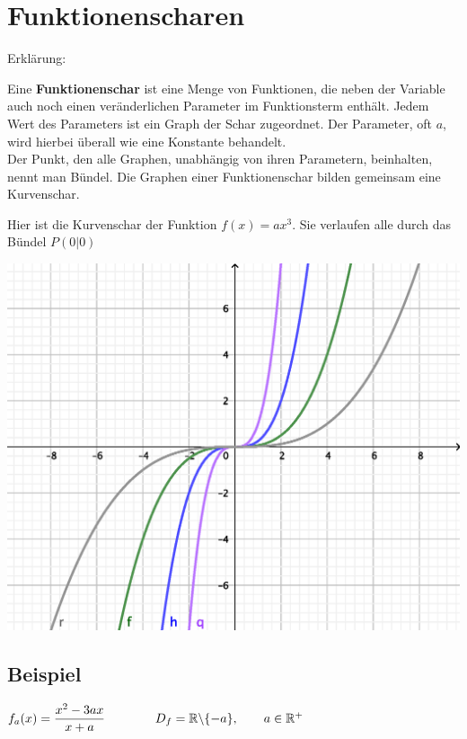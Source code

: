\documentclass[main.tex]{subfiles}
\begin{document}
\section{Funktionenscharen}

Erklärung:

\begin{minipage}[b]{0.5\linewidth}
	Eine \textbf{Funktionenschar} ist eine Menge von Funktionen, die neben der Variable auch noch einen veränderlichen Parameter im Funktionsterm enthält. Jedem Wert des Parameters ist ein Graph der Schar zugeordnet. Der Parameter, oft $a$, wird hierbei überall wie eine Konstante behandelt.\\
	Der Punkt, den alle Graphen, unabhängig von ihren Parametern, beinhalten, nennt man Bündel. Die Graphen einer
	Funktionenschar bilden gemeinsam eine Kurvenschar.

	Hier ist die Kurvenschar der Funktion $f(x)=ax^3$. Sie verlaufen alle durch das Bündel $P(0|0)$
\end{minipage}
\hfill
\begin{minipage}[b]{0.4\linewidth}
	\includegraphics[height=12\baselineskip]{kap3/BundelFunktionenscharen.eps}
\end{minipage}

\subsection{Beispiel}

$f_{a}(x)= \dfrac{x^2-3ax}{x+a} \qquad \qquad D_{f} = \mathbb{R} \backslash \{ -a \}, \qquad a \in \mathbb{R}^+$
\end{document}
